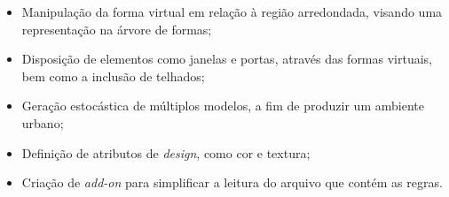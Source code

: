 \begin{itemize}
    \item Manipulação da forma virtual em relação à região arredondada, visando uma representação na árvore de formas;
    \item Disposição de elementos como janelas e portas, através das formas virtuais, bem como a inclusão de telhados;
    \item Geração estocástica de múltiplos modelos, a fim de produzir um ambiente urbano;
    \item Definição de atributos de \textit{design}, como cor e textura;
    \item Criação de \textit{add-on} para simplificar a leitura do arquivo que contém as regras.
\end{itemize}